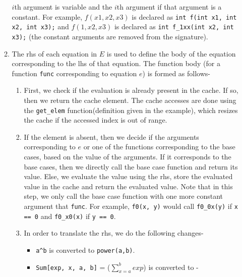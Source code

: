 \documentclass{article}
\begin{document}
\begin{itemize}
\begin{enumerate}
                $i$th argument is variable and the $i$th argument if that
                argument is a constant. For example, $f(x1, x2, x3)$ is declared
                as \texttt{int f(int x1, int x2, int x3);} and $f(1, x2, x3)$ is
                declared as \texttt{int f\_1xx(int x2, int x3);} (the constant
                arguments are removed from the signature).
          \item The rhs of each equation in $E$ is used to define the body of
                the equation corresponding to the lhs of that equation. The
                function body (for a function \texttt{func} corresponding to
                equation $e$) is formed as follows-
                \begin{enumerate}
                  \item First, we check if the evaluation is already present in
                        the cache. If so, then we return the cache element. The
                        cache accesses are done using the \texttt{get\_elem}
                        function(definition given in the example), which resizes
                        the cache if the accessed index is out of range.
                  \item If the element is absent, then we decide if the
                        arguments corresponding to $e$ or one of the functions
                        corresponding to the base cases, based on the value of
                        the arguments. If it corresponds to the base cases, then
                        we directly call the base case function and return its
                        value. Else, we evaluate the value using the rhs, store
                        the evaluated value in the cache and return the
                        evaluated value. Note that in this step, we only call
                        the base case function with one more constant argument
                        that \texttt{func}. For example, \texttt{f0(x, y)} would
                        call \texttt{f0\_0x(y)} if \texttt{x == 0} and
                        \texttt{f0\_x0(x)} if \texttt{y == 0}.
                  \item In order to translate the rhs, we do the following
                        changes-
                        \begin{itemize}
                          \item \verb|a^b| is converted to \texttt{power(a,b)}.
                          \item \texttt{Sum[exp, x, a, b]} = ($\sum_{x=a}^{b}exp$) is converted to -\\

\end{itemize}
\end{enumerate}
\end{enumerate}
\end{itemize}
\end{document}
